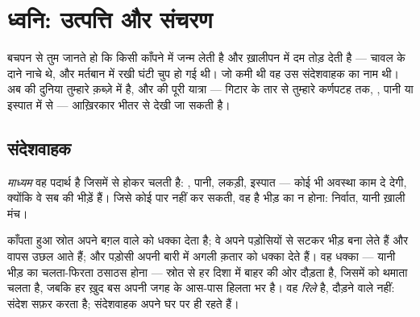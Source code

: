\chapter{ध्वनि: उत्पत्ति और संचरण}\label{ch:g7:sound-production}

बचपन से तुम जानते हो कि  किसी काँपने में जन्म लेती है और
ख़ालीपन में दम तोड़ देती है --- चावल के दाने नाचे थे, और मर्तबान में
रखी घंटी चुप हो गई थी। जो कमी थी वह उस संदेशवाहक का नाम थी। अब
 की दुनिया तुम्हारे क़ब्ज़े में है, और  की पूरी यात्रा ---
गिटार के तार से तुम्हारे कर्णपटह तक, , पानी या इस्पात में से ---
आख़िरकार भीतर से देखी जा सकती है।

\section{संदेशवाहक}

\begin{definition}[माध्यम]\label{def:g7:sound-production:medium}
\emph{माध्यम} वह पदार्थ है जिसमें से होकर  चलती
है: , पानी, लकड़ी, इस्पात --- कोई भी अवस्था काम दे देगी, क्योंकि
वे सब  की भीड़ें हैं। जिसे कोई  पार नहीं कर सकती, वह है
भीड़ का न होना: निर्वात, यानी ख़ाली मंच।
\end{definition}

\begin{proposition}[ध्वनि चलती कैसे है]\label{prop:g7:sound-production:travel}
काँपता हुआ स्रोत अपने बग़ल वाले  को धक्का देता है; वे अपने
पड़ोसियों से सटकर भीड़ बना लेते हैं और वापस उछल आते हैं; और पड़ोसी
अपनी बारी में अगली क़तार को धक्का देते हैं। वह धक्का --- यानी भीड़ का
चलता-फिरता ठसाठस होना --- स्रोत से हर दिशा में बाहर की ओर दौड़ता है,
जिसमें   को थमाता चलता है, जबकि हर  ख़ुद बस अपनी जगह के
आस-पास हिलता भर है।  वह \emph{रिले} है, दौड़ने वाले नहीं: संदेश
सफ़र करता है; संदेशवाहक अपने घर पर ही रहते हैं।
\end{proposition}

